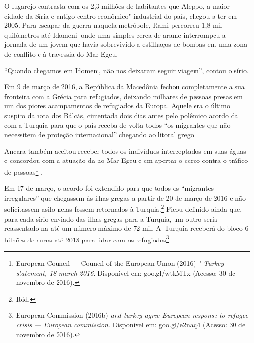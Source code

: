 O lugarejo contrasta com os 2,3 milhões de habitantes que Aleppo, a
maior cidade da Síria e antigo centro econômico"-industrial do país,
chegou a ter em 2005. Para escapar da guerra naquela metrópole, Rami
percorreu 1,8 mil quilômetros até Idomeni, onde uma simples cerca de
arame interrompeu a jornada de um jovem que havia sobrevivido a
estilhaços de bombas em uma zona de conflito e à travessia do Mar Egeu.

``Quando chegamos em Idomeni, não nos deixaram seguir viagem'', contou
o sírio.

 Em 9 de março de 2016, a República da Macedônia fechou completamente a sua
fronteira com a Grécia para refugiados, deixando milhares de
pessoas presas em um dos piores acampamentos de refugiados da Europa.
Aquele era o último suspiro da rota dos Bálcãs, cimentada dois dias
antes pelo polêmico acordo da  com a Turquia para que o país receba de volta todos ``os migrantes que não necessitem de proteção
internacional'' chegando ao litoral grego.
% 
% 
% 
%
%

Ancara também aceitou receber todos os indivíduos interceptados em suas águas e concordou com a
atuação da  no Mar Egeu e em apertar o cerco contra o tráfico de
pessoas\footnote{ European Council --- Council of the European Union
(2016) \emph{"-Turkey statement, 18 march 2016}. Disponível em:
goo.gl/wtkMTx
(Acesso: 30 de novembro de 2016).} .

% 
% 
Em 17 de março, o acordo foi extendido para que todos os ``migrantes
irregulares'' que chegassem às ilhas gregas a partir de 20 de março de
2016 e não solicitassem asilo nelas fossem retornados à
Turquia.\footnote{ Ibid.}  Ficou definido ainda que, para cada sírio
enviado das ilhas gregas para a Turquia, um outro seria reassentado na
 até um número máximo de 72 mil. A~Turquia receberá do bloco 6 bilhões
de euros até 2018 para lidar com os refugiados\footnote{ European Commission (2016b) \emph{ and turkey agree
European response to refugee crisis --- European commission}. Disponível
em: goo.gl/e2naq4
(Acesso: 30 de
novembro de 2016).}.

